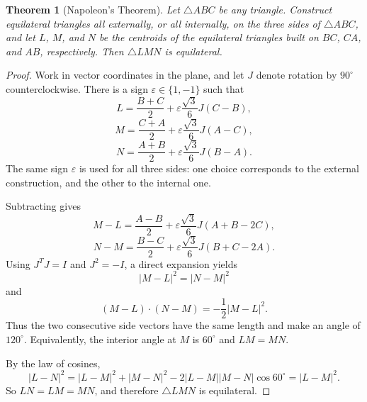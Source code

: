\documentclass[11pt]{article}
\newtheorem{theorem}{Theorem}
\begin{document}
\begin{theorem}[Napoleon's Theorem]
\label{thm:napoleon}
Let $\triangle ABC$ be any triangle. Construct equilateral triangles all
externally, or all internally, on the three sides of $\triangle ABC$, and let
$L$, $M$, and $N$ be the centroids of the equilateral triangles built on
$BC$, $CA$, and $AB$, respectively. Then $\triangle LMN$ is equilateral.
\end{theorem}

\begin{proof}
Work in vector coordinates in the plane, and let $J$ denote rotation by
$90^\circ$ counterclockwise. There is a sign
$\varepsilon\in\{1,-1\}$ such that
\[
L=\frac{B+C}{2}+\varepsilon\frac{\sqrt{3}}{6}J(C-B),
\]
\[
M=\frac{C+A}{2}+\varepsilon\frac{\sqrt{3}}{6}J(A-C),
\]
\[
N=\frac{A+B}{2}+\varepsilon\frac{\sqrt{3}}{6}J(B-A).
\]
The same sign $\varepsilon$ is used for all three sides: one choice
corresponds to the external construction, and the other to the internal one.

Subtracting gives
\[
M-L=\frac{A-B}{2}+\varepsilon\frac{\sqrt{3}}{6}J(A+B-2C),
\]
\[
N-M=\frac{B-C}{2}+\varepsilon\frac{\sqrt{3}}{6}J(B+C-2A).
\]
Using $J^TJ=I$ and $J^2=-I$, a direct expansion yields
\[
|M-L|^2=|N-M|^2
\]
and
\[
(M-L)\cdot(N-M)=-\frac12|M-L|^2.
\]
Thus the two consecutive side vectors have the same length and make an angle
of $120^\circ$. Equivalently, the interior angle at $M$ is $60^\circ$ and
$LM=MN$.

By the law of cosines,
\[
|L-N|^2
=
|L-M|^2+|M-N|^2-2|L-M||M-N|\cos 60^\circ
=
|L-M|^2.
\]
So $LN=LM=MN$, and therefore $\triangle LMN$ is equilateral.
\end{proof}
\end{document}
